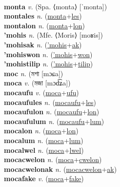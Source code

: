  \label{'monkoltilip} \\
\textbf{monta} \textit{v.} (Spa. ⟨monta⟩ [ˈmonta])
 \label{monta} \\
\textbf{montales} \textit{n.} (\hyperref[monta]{monta}+\hyperref[les]{les})
 \label{montales} \\
\textbf{montalon} \textit{n.} (\hyperref[monta]{monta}+\hyperref[lon]{lon})
 \label{montalon} \\
\textbf{'mohis} \textit{n.} (Mfe. ⟨Moris⟩ [moʁis])
 \label{'mohis} \\
\textbf{'mohisak} \textit{n.} (\hyperref['mohis]{'mohis}+\hyperref[ak]{ak})
 \label{'mohisak} \\
\textbf{'mohiswon} \textit{n.} (\hyperref['mohis]{'mohis}+\hyperref[won]{won})
 \label{'mohiswon} \\
\textbf{'mohistilip} \textit{n.} (\hyperref['mohis]{'mohis}+\hyperref[tilip]{tilip})
 \label{'mohistilip} \\
\textbf{moc} \textit{n.} ({\bengali{}মশা} [mɔɕa])
 \label{moc} \\
\textbf{moca} \textit{v.} ({\bengali{}মজা} [mɔd͡ʑa])
 \label{moca} \\
\textbf{mocaufu} \textit{v.} (\hyperref[moca]{moca}+\hyperref[ufu]{ufu})
 \label{mocaufu} \\
\textbf{mocaufules} \textit{n.} (\hyperref[mocaufu]{mocaufu}+\hyperref[les]{les})
 \label{mocaufules} \\
\textbf{mocaufulon} \textit{n.} (\hyperref[mocaufu]{mocaufu}+\hyperref[lon]{lon})
 \label{mocaufulon} \\
\textbf{mocaufulum} \textit{n.} (\hyperref[mocaufu]{mocaufu}+\hyperref[lum]{lum})
 \label{mocaufulum} \\
\textbf{mocalon} \textit{n.} (\hyperref[moca]{moca}+\hyperref[lon]{lon})
 \label{mocalon} \\
\textbf{mocalum} \textit{n.} (\hyperref[moca]{moca}+\hyperref[lum]{lum})
 \label{mocalum} \\
\textbf{mocalwel} \textit{n.} (\hyperref[moca]{moca}+\hyperref[lwel]{lwel})
 \label{mocalwel} \\
\textbf{mocacwelon} \textit{n.} (\hyperref[moca]{moca}+\hyperref[cwelon]{cwelon})
 \label{mocacwelon} \\
\textbf{mocacwelonak} \textit{n.} (\hyperref[mocacwelon]{mocacwelon}+\hyperref[ak]{ak})
 \label{mocacwelonak} \\
\textbf{mocafake} \textit{v.} (\hyperref[moca]{moca}+\hyperref[fake]{fake})
 \label{mocafake} \\
